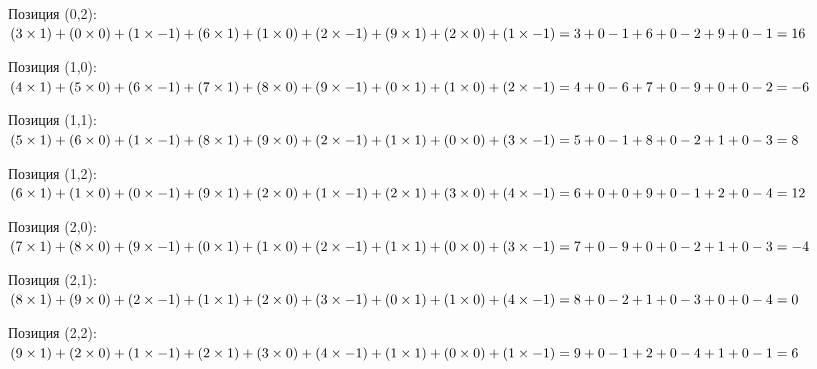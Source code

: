 \begin{description}
	      Позиция (0,2):
	      $
		      (3 \times 1) + (0 \times 0) + (1 \times -1) + \\
		      (6 \times 1) + (1 \times 0) + (2 \times -1) + \\
		      (9 \times 1) + (2 \times 0) + (1 \times -1) = \\
		      3 + 0 - 1 + 6 + 0 - 2 + 9 + 0 - 1 = 16
	      $

	      Позиция (1,0):
	      $
		      (4 \times 1) + (5 \times 0) + (6 \times -1) + \\
		      (7 \times 1) + (8 \times 0) + (9 \times -1) + \\
		      (0 \times 1) + (1 \times 0) + (2 \times -1) = \\
		      4 + 0 - 6 + 7 + 0 - 9 + 0 + 0 - 2 = -6
	      $

	      Позиция (1,1):
	      $
		      (5 \times 1) + (6 \times 0) + (1 \times -1) + \\
		      (8 \times 1) + (9 \times 0) + (2 \times -1) + \\
		      (1 \times 1) + (0 \times 0) + (3 \times -1) = \\
		      5 + 0 - 1 + 8 + 0 - 2 + 1 + 0 - 3 = 8
	      $

	      Позиция (1,2):
	      $
		      (6 \times 1) + (1 \times 0) + (0 \times -1) + \\
		      (9 \times 1) + (2 \times 0) + (1 \times -1) + \\
		      (2 \times 1) + (3 \times 0) + (4 \times -1) = \\
		      6 + 0 + 0 + 9 + 0 - 1 + 2 + 0 - 4 = 12
	      $

	      Позиция (2,0):
	      $
		      (7 \times 1) + (8 \times 0) + (9 \times -1) + \\
		      (0 \times 1) + (1 \times 0) + (2 \times -1) + \\
		      (1 \times 1) + (0 \times 0) + (3 \times -1) = \\
		      7 + 0 - 9 + 0 + 0 - 2 + 1 + 0 - 3 = -4
	      $

	      Позиция (2,1):
	      $
		      (8 \times 1) + (9 \times 0) + (2 \times -1) + \\
		      (1 \times 1) + (2 \times 0) + (3 \times -1) + \\
		      (0 \times 1) + (1 \times 0) + (4 \times -1) = \\
		      8 + 0 - 2 + 1 + 0 - 3 + 0 + 0 - 4 = 0
	      $

	      Позиция (2,2):
	      $
		      (9 \times 1) + (2 \times 0) + (1 \times -1) + \\
		      (2 \times 1) + (3 \times 0) + (4 \times -1) + \\
		      (1 \times 1) + (0 \times 0) + (1 \times -1) = \\
		      9 + 0 - 1 + 2 + 0 - 4 + 1 + 0 - 1 = 6
	      $


\end{description}
